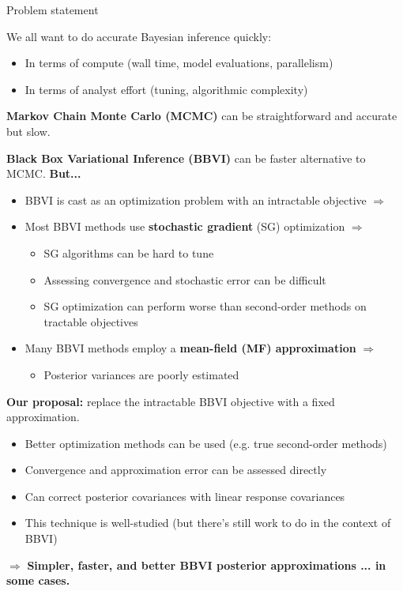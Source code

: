 \documentclass[8pt]{beamer}\usepackage[]{graphicx}\usepackage[]{color}
\begin{document}
\begin{frame}{Problem statement}

We all want to do accurate Bayesian inference quickly:
%
\begin{itemize}
    \item In terms of compute (wall time, model evaluations, parallelism)
    \item In terms of analyst effort (tuning, algorithmic complexity)
\end{itemize}
%
\textbf{Markov Chain Monte Carlo (MCMC)} can be
straightforward and accurate but slow.

\pause
\vspace{-0.5em}
\hrulefill

\textbf{Black Box Variational Inference (BBVI)} can be faster alternative to MCMC.
%
\textbf{But...}

%
\begin{itemize}
    \item BBVI is cast as an optimization problem with an intractable objective $\Rightarrow$
    \item Most BBVI methods use \textbf{stochastic gradient} (SG) optimization $\Rightarrow$
    \begin{itemize}
        \item SG algorithms can be hard to tune
        \item Assessing convergence and stochastic error can be difficult
        \item SG optimization can perform worse than second-order methods on tractable objectives
    \end{itemize}
    \item Many BBVI methods employ a \textbf{mean-field (MF) approximation} $\Rightarrow$
    \begin{itemize}
        \item Posterior variances are poorly estimated
    \end{itemize}
\end{itemize}
%
\pause
\vspace{-0.5em}
\hrulefill

\textbf{Our proposal:}
replace the intractable BBVI objective with a fixed approximation.
%
\begin{itemize}
    \item Better optimization methods can be used (e.g. true second-order methods)
    \item Convergence and approximation error can be assessed directly
    \item Can correct posterior covariances with linear response covariances
    \item This technique is well-studied (but there's still work to do in the context of BBVI)
\end{itemize}
%
$\Rightarrow$
\textbf{Simpler, faster, and better BBVI posterior approximations ... in some cases.}
%
\end{frame}
\end{document}

